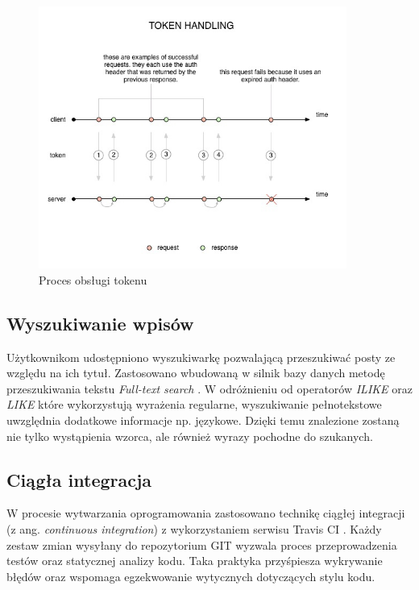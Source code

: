 \documentclass[declaration,shortabstract,polish,inz]{iithesis}
\begin{document}
\begin{figure}[H]
    \centering
    \includegraphics[width=0.9\textwidth]{images/token-update-detail.jpg}
    \caption{Proces obsługi tokenu \cite{token}}
    \label{fig:token}
\end{figure}

\subsection{Wyszukiwanie wpisów}
Użytkownikom udostępniono wyszukiwarkę pozwalającą przeszukiwać posty ze względu na ich tytuł. Zastosowano wbudowaną w silnik bazy danych metodę przeszukiwania tekstu \textit{Full-text search} \cite{textsearch}. W odróżnieniu od operatorów \textit{ILIKE} oraz \textit{LIKE} które wykorzystują wyrażenia regularne, wyszukiwanie pełnotekstowe uwzględnia dodatkowe informacje np. językowe. Dzięki temu znalezione zostaną nie tylko wystąpienia wzorca, ale również wyrazy pochodne do szukanych.


\subsection{Ciągła integracja}
W procesie wytwarzania oprogramowania zastosowano technikę ciągłej integracji (z ang. \textit{continuous integration}) \cite{ci} z wykorzystaniem serwisu Travis CI \cite{travis}. Każdy zestaw zmian wysyłany do repozytorium GIT wyzwala proces przeprowadzenia testów oraz statycznej analizy kodu. Taka praktyka przyśpiesza wykrywanie błędów oraz wspomaga egzekwowanie wytycznych dotyczących stylu kodu.
\end{document}
